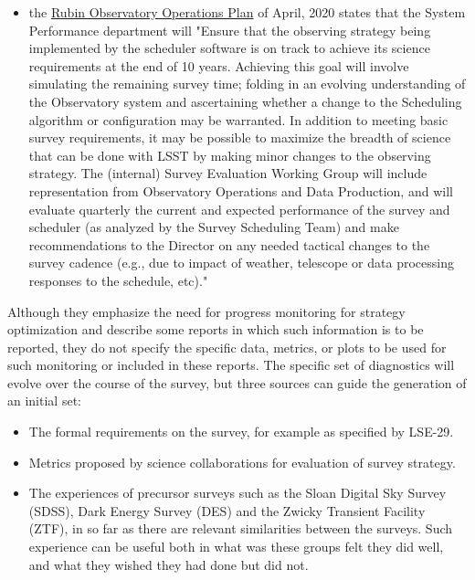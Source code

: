 \begin{itemize}
\item the \href{https://docushare.lsst.org/docushare/dsweb/Get/Document-36797/Rubin\%20Observatory\%20Operations\%20Plan\%20April\%202020.pdf}{Rubin Observatory Operations Plan} of April, 2020 states that the System Performance department will "Ensure that the observing strategy being implemented by the scheduler software is on track to achieve its science requirements at the end of 10 years. Achieving this goal will involve simulating the remaining survey time; folding in an evolving understanding of the Observatory system and ascertaining whether a change to the Scheduling algorithm or configuration may be warranted. In addition to meeting basic survey requirements, it may be possible to maximize the breadth of science that can be done with LSST by making minor changes to the observing strategy. The (internal) Survey Evaluation Working Group will include representation from Observatory Operations and Data Production, and will evaluate quarterly the current and expected performance of the survey and scheduler (as analyzed by the Survey Scheduling Team) and make recommendations to the Director on any needed tactical changes to the survey cadence (e.g., due to impact of weather, telescope or data processing responses to the schedule, etc)."
\end{itemize}

Although they emphasize the need for progress monitoring for strategy optimization and describe some reports in which such information is to be reported, they do not specify the specific data, metrics, or plots to be used for such monitoring or included in these reports.
The specific set of diagnostics will evolve over the course of the survey, but three sources can guide the generation of an initial set:
\begin{itemize}
\item The formal requirements on the survey, for example as specified by LSE-29.
\item Metrics proposed by science collaborations for evaluation of survey strategy.
\item The experiences of precursor surveys such as the Sloan Digital Sky Survey (SDSS), Dark Energy Survey (DES) and the Zwicky Transient Facility (ZTF), in so far as there are relevant similarities between the surveys. Such experience can be useful both in what was these groups felt they did well, and what they wished they had done but did not.
\end{itemize}

